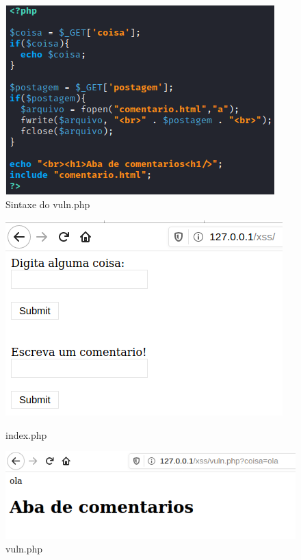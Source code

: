 \documentclass{report}
\begin{document}
\begin{figure}[!htb]
\centering
{}
  \includegraphics[width=\linewidth]{imagessqlcode/sqlcode3.png}
  \caption{Sintaxe do vuln.php}\label{sintaxe vuln.php}
\endminipage
\end{figure}
\begin{figure}[!htb]
  \includegraphics[width=\linewidth]{imagessql/Fig9.png}
  \caption{index.php}\label{index.php}
\endminipage\hfill
{}
  \includegraphics[width=\linewidth]{imagessql/Fig10.png}
  \caption{vuln.php}\label{vuln.php}
\endminipage
\end{figure}
\clearpage
\end{document}
